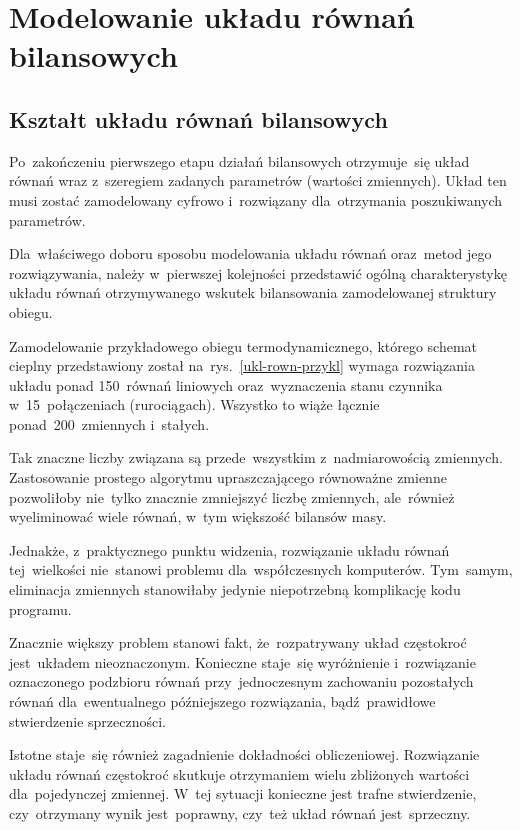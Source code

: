 \section{Modelowanie układu równań bilansowych}

\subsection{Kształt układu równań bilansowych}

Po~zakończeniu pierwszego etapu działań bilansowych otrzymuje~się układ
równań wraz z~szeregiem zadanych parametrów (wartości zmiennych). Układ
ten musi zostać zamodelowany cyfrowo i~rozwiązany dla~otrzymania
poszukiwanych parametrów.

Dla~właściwego doboru sposobu modelowania układu równań oraz~metod jego
rozwiązywania, należy w~pierwszej kolejności przedstawić ogólną
charakterystykę układu równań otrzymywanego wskutek bilansowania
zamodelowanej struktury obiegu.



Zamodelowanie przykładowego obiegu termodynamicznego, którego schemat
cieplny przedstawiony został na~rys.~\ref{ukl-rown-przykl} wymaga
rozwiązania układu ponad 150~równań liniowych oraz~wyznaczenia stanu
czynnika w~15~połączeniach (rurociągach). Wszystko to wiąże łącznie
ponad~200~zmiennych i~stałych.

Tak znaczne liczby związana są przede~wszystkim z~nadmiarowością
zmiennych. Zastosowanie prostego algorytmu upraszczającego równoważne
zmienne pozwoliłoby nie~tylko znacznie zmniejszyć liczbę zmiennych,
ale~również wyeliminować wiele równań, w~tym większość bilansów masy.

Jednakże, z~praktycznego punktu widzenia, rozwiązanie układu równań
tej~wielkości nie~stanowi problemu dla~współczesnych komputerów.
Tym~samym, eliminacja zmiennych stanowiłaby jedynie niepotrzebną
komplikację kodu programu.

Znacznie większy problem stanowi fakt, że~rozpatrywany układ częstokroć
jest~układem nieoznaczonym. Konieczne staje~się wyróżnienie
i~rozwiązanie oznaczonego podzbioru równań przy~jednoczesnym zachowaniu
pozostałych równań dla~ewentualnego późniejszego rozwiązania,
bądź~prawidłowe stwierdzenie sprzeczności.

Istotne staje~się również zagadnienie dokładności obliczeniowej.
Rozwiązanie układu równań częstokroć skutkuje otrzymaniem wielu
zbliżonych wartości dla~pojedynczej zmiennej. W~tej sytuacji konieczne
jest trafne stwierdzenie, czy~otrzymany wynik jest~poprawny, czy~też
układ równań jest~sprzeczny.


